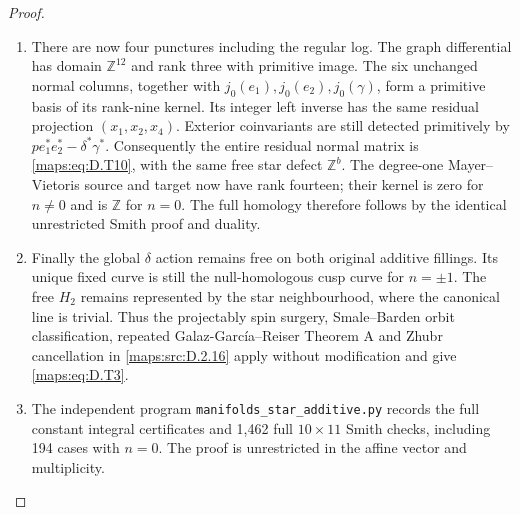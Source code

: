 \begin{proof}
\begin{enumerate}[label=\arabic*.,leftmargin=*]
\item There are now four punctures including the regular log.
The graph differential has domain $\mathbb Z^{12}$ and
rank three with primitive image. The six unchanged normal
columns, together with $j_0(e_1),j_0(e_2),j_0(\gamma)$,
form a primitive basis of its rank-nine kernel. Its integer
left inverse has the same residual projection
$(x_1,x_2,x_4)$. Exterior coinvariants are still detected
primitively by $p e_1^*e_2^*-\delta^*\gamma^*$.
Consequently the entire residual normal matrix is \eqref{maps:eq:D.T10},
with the same free star defect $\mathbb Z^b$.
The degree-one Mayer--Vietoris source and target now have
rank fourteen; their kernel is zero for $n\ne0$ and is
$\mathbb Z$ for $n=0$. The full homology therefore follows
by the identical unrestricted Smith proof and duality.

\item Finally the global $\delta$ action remains free on both
original additive fillings. Its unique fixed curve is
still the null-homologous cusp curve for $n=\pm1$.
The free $H_2$ remains represented by the star neighbourhood,
where the canonical line is trivial. Thus the projectably
spin surgery, Smale--Barden orbit classification, repeated
Galaz-Garc\'ia--Reiser Theorem A and Zhubr cancellation in
\ref{maps:src:D.2.16} apply without modification and give \eqref{maps:eq:D.T3}.

\item The independent program
\texttt{manifolds\_star\_additive.py} records the full
constant integral certificates and 1,462 full $10\times11$
Smith checks, including 194 cases with $n=0$. The proof is
unrestricted in the affine vector and multiplicity.
\end{enumerate}
\end{proof}

